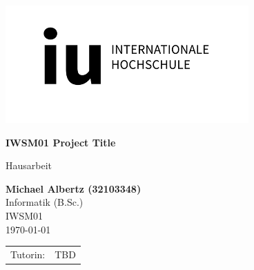 \documentclass[11pt, a4paper, oneside, ngerman]{article}
\newcommand{\blankpage}{
 \clearpage{\pagestyle{empty}\cleardoublepage}
}
\begin{document}

\def\usesf{}
\let\usesf\sffamily %

\setlength{\unitlength}{1pt}

\begin{titlepage}
\vspace{-39pt}\hspace*{300pt}\includegraphics[width=.21\paperwidth]{../template/iu-logo.png}

\begin{center}
\hbox{}
\vfill
{\usesf}
{\huge\bfseries IWSM01 Project Title \par}
\vskip 1.8cm
Hausarbeit\\[2mm]
\vskip 1cm

{\large\bfseries Michael Albertz (32103348)\\}
\vskip 1.2cm
Informatik (B.Sc.)\\
IWSM01\\
\today %
\vskip 3cm
\begin{tabular}{p{3cm}l}
Tutorin: & TBD \\
\end{tabular}
\vfill
\end{center}

\end{titlepage}
\newpage
\setcounter{tocdepth}{3}
\tableofcontents %




\blankpage
{}
\end{document}
